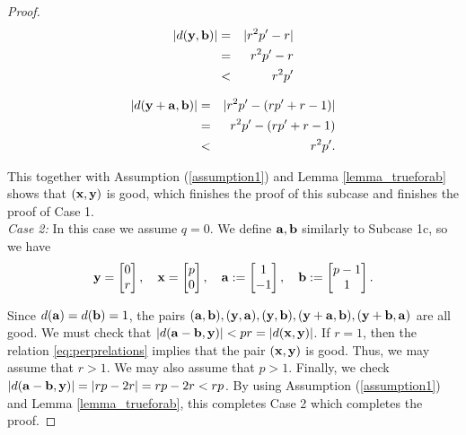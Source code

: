 \begin{proof}
	\begin{eqnarray*}
		\lvert d({\mathbf{y}},{\mathbf{b}})\rvert &=&  \lvert r^2p' - r \rvert \\
		&=& r^2p' - r \\
		&<& r^2p'
	\end{eqnarray*}

	\begin{eqnarray*}
		\lvert d({\mathbf{y}}+{\mathbf{a}}, {\mathbf{b}})\rvert &=&  \lvert r^2p' - (rp'+r-1) \rvert \\
		&=&  r^2p' - (rp'+r-1) \\
		&<& r^2p'.
	\end{eqnarray*}

This together with Assumption (\ref{assumption1}) and Lemma \ref{lemma_trueforab} shows that $({\mathbf{x}},{\mathbf{y}})$ is good, which finishes the proof of this subcase and finishes the proof of Case 1. \\[2mm]
	
	\noindent \emph{Case 2:} In this case we assume $q=0$. We define ${\mathbf{a}}, {\mathbf{b}}$ similarly to Subcase 1c, so we have
	\[
	{\mathbf{y}} = \begin{bmatrix} 0\\r\end{bmatrix},\quad {\mathbf{x}} = \begin{bmatrix} p\\0\end{bmatrix},\quad {\mathbf{a}} := \begin{bmatrix} 1\\-1 \end{bmatrix},\quad {\mathbf{b}} := \begin{bmatrix} p-1\\ 1 \end{bmatrix}.
	\]

	Since $d({\mathbf{a}}) = d({\mathbf{b}}) = 1$, the pairs $({\mathbf{a}},{\mathbf{b}}), ({\mathbf{y}},{\mathbf{a}}), ({\mathbf{y}},{\mathbf{b}}), ({\mathbf{y}}+{\mathbf{a}},{\mathbf{b}}), ({\mathbf{y}}+{\mathbf{b}},{\mathbf{a}})$ are all good. We must check that $\lvert d({\mathbf{a}}-{\mathbf{b}},{\mathbf{y}}) \rvert < pr = \lvert d({\mathbf{x}},{\mathbf{y}}) \rvert$. If $r=1$, then the relation \eqref{eq:perprelations} implies that the pair $({\mathbf{x}},{\mathbf{y}})$ is good. Thus, we may assume that $r>1$. We may also assume that $p>1$. Finally, we check $\lvert d({\mathbf{a}}-{\mathbf{b}},{\mathbf{y}}) \rvert = \lvert rp-2r \rvert = rp-2r < rp$. By using Assumption (\ref{assumption1}) and Lemma \ref{lemma_trueforab}, this completes Case 2 which completes the proof. 
\end{proof}



